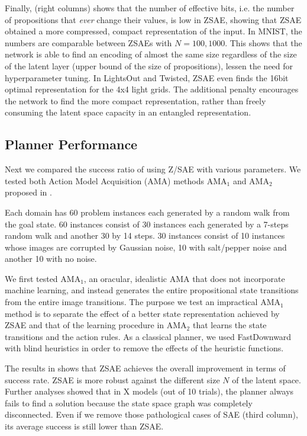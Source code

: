 Finally,  (right columns) shows that the number of effective bits,
i.e. the number of propositions that \emph{ever} change their values, is low in ZSAE, showing that
ZSAE obtained a more compressed, compact representation of the input.
In MNIST, the numbers are comparable between ZSAEs with $N=100,1000$.
This shows that the network is able to find an encoding of almost the same size
regardless of the size of the latent layer (upper bound of the size of
propositions), lessen the need for hyperparameter tuning.
In LightsOut and Twisted, ZSAE even finds the 16bit optimal representation for the 4x4 light grids.
The additional
penalty encourages the network to find the more compact representation,
rather than freely consuming the latent space capacity in an entangled representation.


\subsection{Planner Performance}

Next we compared the success ratio of \latentplanner using Z/SAE with various parameters.
We tested both Action Model Acquisition (AMA) methods AMA$_1$ and AMA$_2$ proposed in \cite{Asai2018}.

Each domain has 60 problem instances each generated by a random walk from
the goal state. 60 instances consist of 30 instances each generated by a 7-steps random walk
and another 30 by 14 steps. 30 instances consist of 10 instances whose images are corrupted by Gaussian noise,
10 with salt/pepper noise and another 10 with no noise.

We first tested AMA$_1$, an oracular, idealistic AMA that does not incorporate machine learning,
and instead generates the entire propositional state transitions from the entire image transitions.
The purpose we test an impractical AMA$_1$ method is
to separate the effect of a better state representation achieved by ZSAE
and that of the learning procedure in AMA$_2$ that learns the state transitions and the action rules.
As a classical planner, we used FastDownward \cite{Helmert04} with blind heuristics in order to
remove the effects of the heuristic functions.

The results in  shows that ZSAE achieves the overall improvement in terms of success rate.
ZSAE is more robust against the different size $N$ of the latent space.
% 
Further analyses showed that
in X models (out of 10 trials), the planner always fails to find a solution because
the state space graph was completely disconnected.
% 
Even if we remove those pathological cases of SAE (third column), its average success is still
lower than ZSAE.

